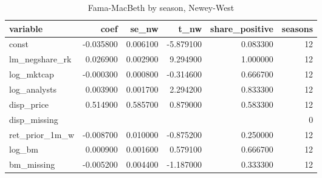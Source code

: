 \begin{table}
\caption{Fama-MacBeth by season, Newey-West}
\label{tab:t8_fama_macbeth__lm_negshare__car_0_1_ff4__validation}
\begin{tabular}{lrrrrr}
\toprule
variable & coef & se\_nw & t\_nw & share\_positive & seasons \\
\midrule
const & -0.035800 & 0.006100 & -5.879100 & 0.083300 & 12 \\
lm\_negshare\_rk & 0.026900 & 0.002900 & 9.294900 & 1.000000 & 12 \\
log\_mktcap & -0.000300 & 0.000800 & -0.314600 & 0.666700 & 12 \\
log\_analysts & 0.003900 & 0.001700 & 2.294200 & 0.833300 & 12 \\
disp\_price & 0.514900 & 0.585700 & 0.879000 & 0.583300 & 12 \\
disp\_missing &  &  &  &  & 0 \\
ret\_prior\_1m\_w & -0.008700 & 0.010000 & -0.875200 & 0.250000 & 12 \\
log\_bm & 0.000900 & 0.001600 & 0.579100 & 0.666700 & 12 \\
bm\_missing & -0.005200 & 0.004400 & -1.187000 & 0.333300 & 12 \\
\bottomrule
\end{tabular}
\end{table}
